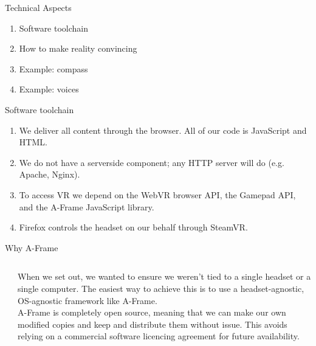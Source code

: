 \documentclass{beamer}
\begin{document}
\begin{frame}{Technical Aspects}
	\begin{enumerate}
		\item Software toolchain
		\item How to make reality convincing
		\item Example: compass
		\item Example: voices
	\end{enumerate}
\end{frame}
\begin{frame}{Software toolchain}
	\begin{enumerate}
		\item We deliver all content through the browser. All of our code is
			JavaScript and HTML. 
		\item We do not have a serverside component; any HTTP
			server will do (e.g. Apache, Nginx).\\
		\item To access VR we depend on the WebVR browser API, the
			Gamepad API, and the A-Frame JavaScript library.
		\item Firefox controls the headset on our behalf through SteamVR.
	\end{enumerate}
\end{frame}
\begin{frame}{Why A-Frame}
	\begin{columns}[t]
		\begin{column}{.3\textwidth}
		\end{column}
		\begin{column}{.7\textwidth}
	When we set out, we wanted to ensure we weren't tied to a single headset
	or a single computer. The easiest way to achieve this is to use a
	headset-agnostic, OS-agnostic framework like A-Frame.\\
	A-Frame is completely open source, meaning that we can make our own
	modified copies and keep and distribute them without issue. This avoids
	relying on a commercial software licencing agreement for future availability.
		\end{column}
	\end{columns}
\end{frame}
\end{document}
